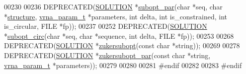 \begin{DoxyCode}
00230 
00236 DEPRECATED(\hyperlink{structvrna__subopt__sol__s}{SOLUTION} *\hyperlink{group__subopt__wuchty_gaa1e1e7031a948ebcb39a9d58d1e9842c}{subopt\_par}(\textcolor{keywordtype}{char} *seq, \textcolor{keywordtype}{char} *\hyperlink{structvrna__subopt__sol__s_a3c632c7f08eb6a8827c6151625e5ef8e}{structure}, 
      \hyperlink{group__energy__parameters_structvrna__param__s}{vrna\_param\_t} *parameters, \textcolor{keywordtype}{int} delta, \textcolor{keywordtype}{int} is\_constrained, \textcolor{keywordtype}{int} is\_circular, FILE *fp));
00237 
00252 DEPRECATED(\hyperlink{structvrna__subopt__sol__s}{SOLUTION} *\hyperlink{group__subopt__wuchty_ga8634516e4740e0b6c9a46d2bae940340}{subopt\_circ}(\textcolor{keywordtype}{char} *seq, \textcolor{keywordtype}{char} *sequence, \textcolor{keywordtype}{int} delta, FILE *fp));
00253 
00268 DEPRECATED(\hyperlink{structvrna__subopt__sol__s}{SOLUTION}  *\hyperlink{group__subopt__zuker_ga0d5104e3ecf119d8eabd40aa5fe47f90}{zukersubopt}(\textcolor{keyword}{const} \textcolor{keywordtype}{char} *\textcolor{keywordtype}{string}));
00269 
00278 DEPRECATED(\hyperlink{structvrna__subopt__sol__s}{SOLUTION}  *\hyperlink{group__subopt__zuker_gab6d0ea8cc1d02f6dd831ca81043c9eb8}{zukersubopt\_par}(\textcolor{keyword}{const} \textcolor{keywordtype}{char} *\textcolor{keywordtype}{string}, 
      \hyperlink{group__energy__parameters_structvrna__param__s}{vrna\_param\_t} *parameters));
00279 
00280 
00281 \textcolor{preprocessor}{#endif}
00282 
00283 \textcolor{preprocessor}{#endif}
\end{DoxyCode}
